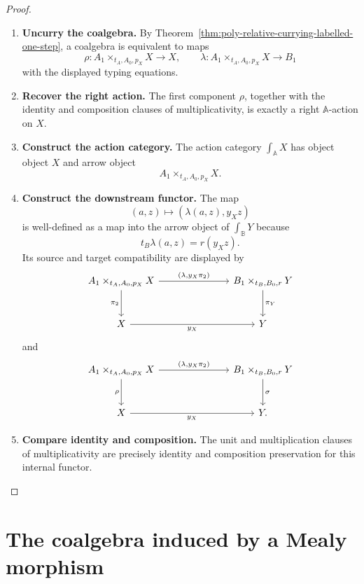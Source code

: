 \begin{proof}
\leavevmode
\begin{enumerate}
\item \textbf{Uncurry the coalgebra.}
By Theorem~\ref{thm:poly-relative-currying-labelled-one-step}, a coalgebra is
equivalent to maps
\[
\rho:
A_1\times_{t_A,A_0,p_X}X\to X,
\qquad
\lambda:
A_1\times_{t_A,A_0,p_X}X\to B_1
\]
with the displayed typing equations.

\item \textbf{Recover the right action.}
The first component \(\rho\), together with the identity and composition
clauses of multiplicativity, is exactly a right \(\mathbb A\)-action on
\(X\).

\item \textbf{Construct the action category.}
The action category \(\int_{\mathbb A}X\) has object object \(X\) and arrow
object
\[
A_1\times_{t_A,A_0,p_X}X.
\]

\item \textbf{Construct the downstream functor.}
The map
\[
(a,z)\longmapsto(\lambda(a,z),y_Xz)
\]
is well-defined as a map into the arrow object of \(\int_{\mathbb B}Y\)
because
\[
t_B\lambda(a,z)=r(y_Xz).
\]
Its source and target compatibility are displayed by
\[
\begin{tikzcd}[column sep=large,row sep=large]
A_1\times_{t_A,A_0,p_X}X
  \arrow[rr,"{(\lambda,y_X\pi_2)}"]
  \arrow[d,"\pi_2"']
&&
B_1\times_{t_B,B_0,r}Y
  \arrow[d,"\pi_Y"]
\\
X
  \arrow[rr,"y_X"']
&&
Y
\end{tikzcd}
\]
and
\[
\begin{tikzcd}[column sep=large,row sep=large]
A_1\times_{t_A,A_0,p_X}X
  \arrow[rr,"{(\lambda,y_X\pi_2)}"]
  \arrow[d,"\rho"']
&&
B_1\times_{t_B,B_0,r}Y
  \arrow[d,"\sigma"]
\\
X
  \arrow[rr,"y_X"']
&&
Y .
\end{tikzcd}
\]

\item \textbf{Compare identity and composition.}
The unit and multiplication clauses of multiplicativity are precisely identity
and composition preservation for this internal functor.
\end{enumerate}
\end{proof}

\section{The coalgebra induced by a Mealy morphism}
\label{sec:poly-relative-induced-coalgebra}

